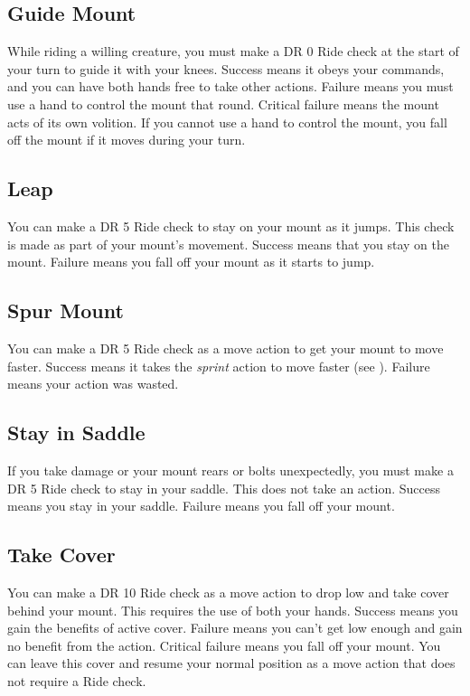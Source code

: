     \subsection{Guide Mount}
        While riding a willing creature, you must make a DR 0 Ride check at the start of your turn to guide it with your knees. Success means it obeys your commands, and you can have both hands free to take other actions. Failure means you must use a hand to control the mount that round. Critical failure means the mount acts of its own volition. If you cannot use a hand to control the mount, you fall off the mount if it moves during your turn.

    \subsection{Leap}
        You can make a DR 5 Ride check to stay on your mount as it jumps. This check is made as part of your mount's movement. Success means that you stay on the mount. Failure means you fall off your mount as it starts to jump.

    \subsection{Spur Mount}
        You can make a DR 5 Ride check as a move action to get your mount to move faster. Success means it takes the \textit{sprint} action to move faster (see ).
        Failure means your action was wasted.

    \subsection{Stay in Saddle}
        If you take damage or your mount rears or bolts unexpectedly, you must make a DR 5 Ride check to stay in your saddle. This does not take an action. Success means you stay in your saddle. Failure means you fall off your mount.

    \subsection{Take Cover}
        You can make a DR 10 Ride check as a move action to drop low and take cover behind your mount. This requires the use of both your hands. Success means you gain the benefits of active cover. Failure means you can't get low enough and gain no benefit from the action. Critical failure means you fall off your mount. You can leave this cover and resume your normal position as a move action that does not require a Ride check.


